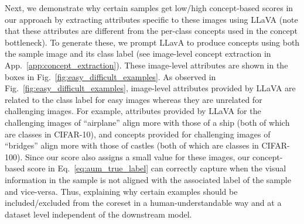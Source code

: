 Next, we demonstrate why certain samples get low/high concept-based scores in our approach by extracting attributes specific to these images using LLaVA (note that these attributes are different from the per-class concepts used in the concept bottleneck). 
To generate these, we prompt LLavA to produce concepts using both the sample image and its class label (see image-level concept extraction in App.~\ref{app:concept_extraction}).
These image-level attributes are shown in the boxes in Fig.~\ref{fig:easy_difficult_examples}.
As observed in Fig.~\ref{fig:easy_difficult_examples}, image-level attributes provided by LLaVA are related to the class label for easy images whereas they are unrelated for challenging images. 
For example, attributes provided by LLaVA for the challenging images of ``airplane'' align more with those of a ship (both of which are classes in CIFAR-10), and concepts provided for challenging images of ``bridges'' align more with those of castles (both of which are classes in CIFAR-100). 
Since our score also assigns a small value for these images, our concept-based score in Eq.~\ref{eq:aum_true_label} can correctly capture when the visual information in the sample is not aligned with the associated label of the sample and vice-versa. 
Thus, explaining why certain examples should be included/excluded from the coreset in a human-understandable way and at a dataset level independent of the downstream model.

